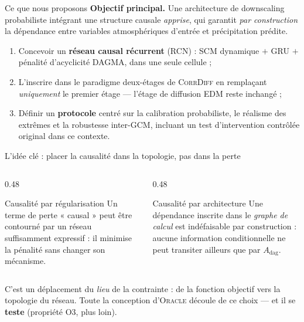 \documentclass[aspectratio=169,10pt]{beamer}
\newcommand{\Oracle}{\textsc{Oracle}}
\newcommand{\CorrDiff}{\textsc{CorrDiff}}
\newcommand{\Adag}{A_{\mathrm{dag}}}
\begin{document}
\begin{frame}{Ce que nous proposons}
  \textbf{Objectif principal.} Une architecture de downscaling probabiliste intégrant une
  structure causale \emph{apprise}, qui garantit \emph{par construction} la dépendance
  entre variables atmosphériques d'entrée et précipitation prédite.
  \vspace{0.25cm}
  \begin{enumerate}
    \item Concevoir un \textbf{réseau causal récurrent} (RCN) : SCM dynamique $+$ GRU $+$
          pénalité d'acyclicité DAGMA, dans une seule cellule ;
    \item L'inscrire dans le paradigme deux-étages de \CorrDiff{} en remplaçant
          \emph{uniquement} le premier étage --- l'étage de diffusion EDM reste
          \alert{inchangé} ;
    \item Définir un \textbf{protocole} centré sur la calibration probabiliste, le réalisme
          des extrêmes et la robustesse inter-GCM, incluant un test d'intervention
          contrôlée original dans ce contexte.
  \end{enumerate}
\end{frame}

\begin{frame}{L'idée clé : placer la causalité dans la topologie, pas dans la perte}
  \begin{columns}[T]
    \begin{column}{0.48\textwidth}
      \begin{alertblock}{Causalité par régularisation}
        \small Un terme de perte « causal » peut être \alert{contourné} par un réseau
        suffisamment expressif : il minimise la pénalité sans changer son mécanisme.
      \end{alertblock}
    \end{column}
    \begin{column}{0.48\textwidth}
      \begin{exampleblock}{Causalité par architecture}
        \small Une dépendance inscrite dans le \emph{graphe de calcul} est
        \alert{indéfaisable par construction} : aucune information conditionnelle
        ne peut transiter ailleurs que par $\Adag$.
      \end{exampleblock}
    \end{column}
  \end{columns}
  \vspace{0.35cm}
  \centering
  \small C'est un déplacement du \emph{lieu} de la contrainte : de la fonction objectif
  vers la topologie du réseau. Toute la conception d'\Oracle{} découle de ce choix ---
  et il se \textbf{teste} (propriété O3, plus loin).
\end{frame}
\end{document}
